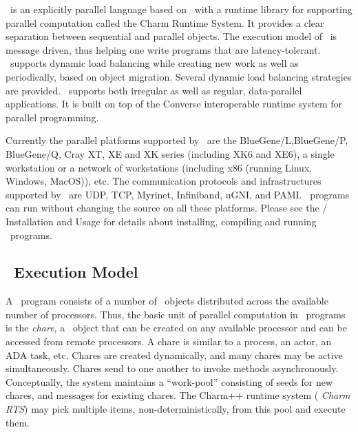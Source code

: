 \charmpp\ is an explicitly parallel language based on \CC\ with a runtime
library for supporting parallel computation called the Charm Runtime System.  It
provides a clear separation between sequential and parallel objects.  The
execution model of \charmpp\ is message driven, thus helping one write programs
that are latency-tolerant.  \charmpp\ supports dynamic load balancing while
creating new work as well as periodically, based on object migration.  Several
dynamic load balancing strategies are provided.  \charmpp\ supports both
irregular as well as regular, data-parallel applications.  It is built on top of the
{\sc Converse} interoperable runtime system for parallel programming.

Currently the parallel platforms supported by \charmpp\ are the
BlueGene/L,BlueGene/P, BlueGene/Q, Cray XT, XE and XK series
(including XK6 and XE6), 
a single workstation or a network of
workstations (including x86 (running Linux, Windows, MacOS)), etc.
The communication protocols and infrastructures supported by
\charmpp\ are UDP, TCP, Myrinet, Infiniband, uGNI, and PAMI. 
\charmpp\ programs can run without changing the source
on all these platforms.  Please see the \charmpp{}/\converse{}
Installation and Usage
for details about installing, compiling and running
\charmpp\ programs.

\subsection{\charmpp\ Execution Model}

A \charmpp\ program consists of a number of \charmpp\ objects distributed
across the available number of processors. Thus, the basic unit of parallel
computation in \charmpp\ programs is the {\em chare}, a \charmpp\
object that can be created on any available processor and can be accessed from
remote processors.  A chare is similar to a process, an actor, an
ADA task, etc.  \index{chare}Chares are created dynamically, and many chares
may be active simultaneously.  Chares send \index{message}{\em messages} to one
another to invoke methods asynchronously.  Conceptually, the system maintains a
``work-pool'' consisting of seeds for new \index{chare}chares, and
\index{message}messages for existing chares. The Charm++ runtime system ({\em
Charm RTS}) may pick multiple items, non-deterministically, from this pool
and execute them.  

